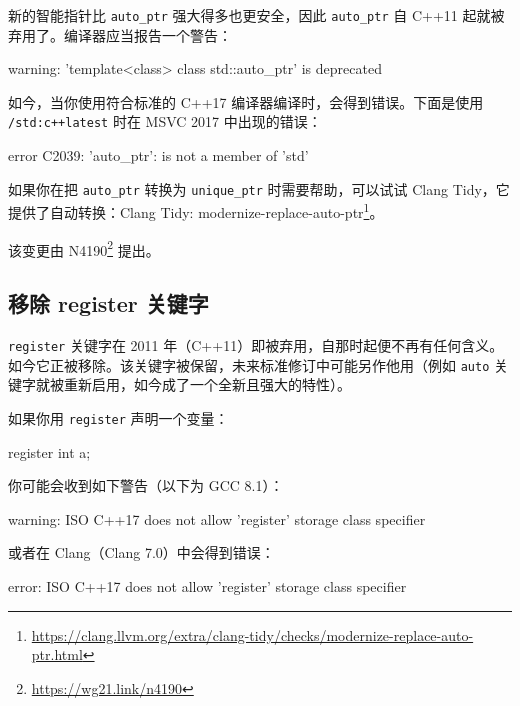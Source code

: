 新的智能指针比 \texttt{auto\_ptr} 强大得多也更安全，因此 \texttt{auto\_ptr} 自 C++11 起就被弃用了。编译器应当报告一个警告：

\begin{codebox}[cpp]
warning: 'template<class> class std::auto_ptr' is deprecated
\end{codebox}

如今，当你使用符合标准的 C++17 编译器编译时，会得到错误。下面是使用 \texttt{/std:c++latest} 时在 MSVC 2017 中出现的错误：

\begin{codebox}[cpp]
error C2039: 'auto_ptr': is not a member of 'std'
\end{codebox}

如果你在把 \texttt{auto\_ptr} 转换为 \texttt{unique\_ptr} 时需要帮助，可以试试 Clang Tidy，它提供了自动转换：Clang Tidy: modernize-replace-auto-ptr\footnote{\url{https://clang.llvm.org/extra/clang-tidy/checks/modernize-replace-auto-ptr.html}}。

\begin{myInfoBox}
该变更由 N4190\footnote{\url{https://wg21.link/n4190}} 提出。
\end{myInfoBox}

\subsection{移除 register 关键字}

\texttt{register} 关键字在 2011 年（C++11）即被弃用，自那时起便不再有任何含义。如今它正被移除。该关键字被保留，未来标准修订中可能另作他用（例如 \texttt{auto} 关键字就被重新启用，如今成了一个全新且强大的特性）。

如果你用 \texttt{register} 声明一个变量：

\begin{codebox}[cpp]
register int a;
\end{codebox}

你可能会收到如下警告（以下为 GCC 8.1）：

\begin{codebox}[cpp]
warning: ISO C++17 does not allow 'register' storage class specifier
\end{codebox}

或者在 Clang（Clang 7.0）中会得到错误：

\begin{codebox}[cpp]
error: ISO C++17 does not allow 'register' storage class specifier
\end{codebox}


